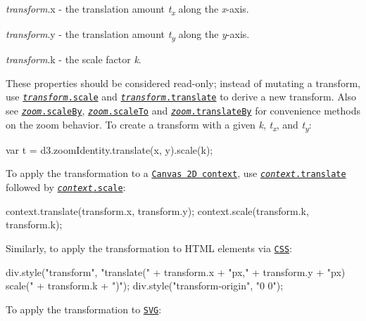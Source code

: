 \begin{DoxyItemize}
\item {\itshape transform}.x -\/ the translation amount {\itshape t\textsubscript{x}} along the {\itshape x}-\/axis.
\item {\itshape transform}.y -\/ the translation amount {\itshape t\textsubscript{y}} along the {\itshape y}-\/axis.
\item {\itshape transform}.k -\/ the scale factor {\itshape k}.
\end{DoxyItemize}

These properties should be considered read-\/only; instead of mutating a transform, use \href{#transform_scale}{\tt {\itshape transform}.scale} and \href{#transform_translate}{\tt {\itshape transform}.translate} to derive a new transform. Also see \href{#zoom_scaleBy}{\tt {\itshape zoom}.scale\+By}, \href{#zoom_scaleTo}{\tt {\itshape zoom}.scale\+To} and \href{#zoom_translateBy}{\tt {\itshape zoom}.translate\+By} for convenience methods on the zoom behavior. To create a transform with a given {\itshape k}, {\itshape t\textsubscript{x}}, and {\itshape t\textsubscript{y}}\+:


\begin{DoxyCode}
var t = d3.zoomIdentity.translate(x, y).scale(k);
\end{DoxyCode}


To apply the transformation to a \href{https://www.w3.org/TR/2dcontext/}{\tt Canvas 2D context}, use \href{https://www.w3.org/TR/2dcontext/#dom-context-2d-translate}{\tt {\itshape context}.translate} followed by \href{https://www.w3.org/TR/2dcontext/#dom-context-2d-scale}{\tt {\itshape context}.scale}\+:


\begin{DoxyCode}
context.translate(transform.x, transform.y);
context.scale(transform.k, transform.k);
\end{DoxyCode}


Similarly, to apply the transformation to H\+T\+ML elements via \href{https://www.w3.org/TR/css-transforms-1/}{\tt C\+SS}\+:


\begin{DoxyCode}
div.style("transform", "translate(" + transform.x + "px," + transform.y + "px) scale(" + transform.k +
       ")");
div.style("transform-origin", "0 0");
\end{DoxyCode}


To apply the transformation to \href{https://www.w3.org/TR/SVG/coords.html#TransformAttribute}{\tt S\+VG}\+:


